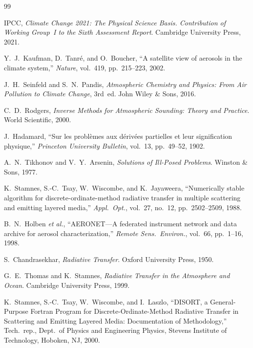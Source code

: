 \documentclass[a4paper, 11pt]{article}
\begin{document}
\begin{thebibliography}{99}

    IPCC,
    \textit{Climate Change 2021: The Physical Science Basis.
    Contribution of Working Group~I to the Sixth Assessment Report}.
    Cambridge University Press, 2021.

    Y.~J.~Kaufman, D.~Tanr\'e, and O.~Boucher,
    ``A satellite view of aerosols in the climate system,''
    \textit{Nature}, vol.~419, pp.~215--223, 2002.

    J.~H.~Seinfeld and S.~N.~Pandis,
    \textit{Atmospheric Chemistry and Physics: From Air Pollution to
    Climate Change}, 3rd~ed.
    John Wiley \& Sons, 2016.

    C.~D.~Rodgers,
    \textit{Inverse Methods for Atmospheric Sounding: Theory and Practice}.
    World Scientific, 2000.

    J.~Hadamard,
    ``Sur les probl\`emes aux d\'eriv\'ees partielles et leur
    signification physique,''
    \textit{Princeton University Bulletin}, vol.~13, pp.~49--52, 1902.

    A.~N.~Tikhonov and V.~Y.~Arsenin,
    \textit{Solutions of Ill-Posed Problems}.
    Winston \& Sons, 1977.

    K.~Stamnes, S.-C.~Tsay, W.~Wiscombe, and K.~Jayaweera,
    ``Numerically stable algorithm for discrete-ordinate-method radiative
    transfer in multiple scattering and emitting layered media,''
    \textit{Appl.\ Opt.}, vol.~27, no.~12, pp.~2502--2509, 1988.

    B.~N.~Holben \textit{et al.},
    ``AERONET---A federated instrument network and data archive for
    aerosol characterization,''
    \textit{Remote Sens.\ Environ.}, vol.~66, pp.~1--16, 1998.

    S.~Chandrasekhar,
    \textit{Radiative Transfer}.
    Oxford University Press, 1950.

    G.~E.~Thomas and K.~Stamnes,
    \textit{Radiative Transfer in the Atmosphere and Ocean}.
    Cambridge University Press, 1999.

    K.~Stamnes, S.-C.~Tsay, W.~Wiscombe, and I.~Laszlo,
    ``DISORT, a General-Purpose Fortran Program for
    Discrete-Ordinate-Method Radiative Transfer in Scattering and
    Emitting Layered Media: Documentation of Methodology,''
    Tech.\ rep., Dept.\ of Physics and Engineering Physics,
    Stevens Institute of Technology, Hoboken, NJ, 2000.


\end{thebibliography}
\end{document}
